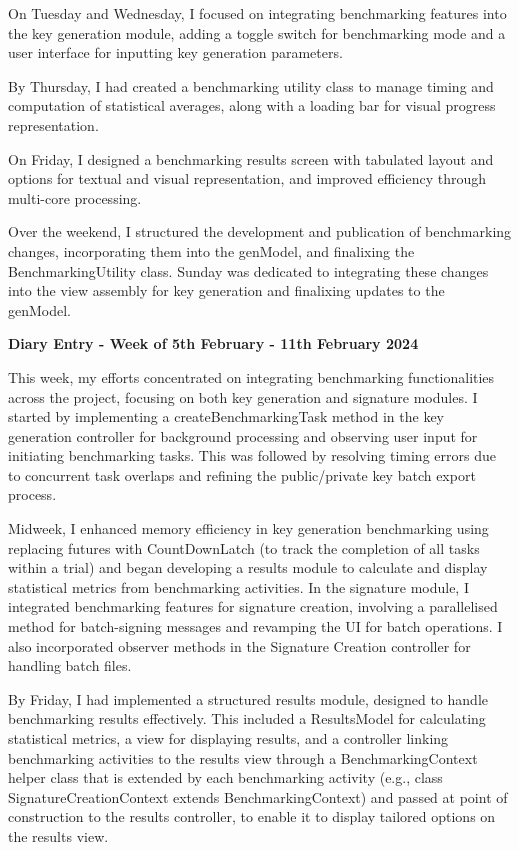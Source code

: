 \documentclass[]{final_report}
\theoremstyle{definition}
\begin{document}
On Tuesday and Wednesday, I focused on integrating benchmarking features into the key generation
module, adding a toggle switch for benchmarking mode and a user interface for inputting key
generation parameters.

By Thursday, I had created a benchmarking utility class to manage timing and computation of
statistical averages, along with a loading bar for visual progress representation.

On Friday, I designed a benchmarking results screen with tabulated layout and options for textual
and visual representation, and improved efficiency through multi-core processing.

Over the weekend, I structured the development and publication of benchmarking changes,
incorporating them into the genModel, and finalixing the BenchmarkingUtility class. Sunday was
dedicated to integrating these changes into the view assembly for key generation and finalixing
updates to the genModel.

\textbf{Diary Entry - Week of 5th February - 11th February 2024}

This week, my efforts concentrated on integrating benchmarking functionalities across the project,
focusing on both key generation and signature modules. I started by implementing a
createBenchmarkingTask method in the key generation controller for background processing and
observing user input for initiating benchmarking tasks. This was followed by resolving timing errors
due to concurrent task overlaps and refining the public/private key batch export process.

Midweek, I enhanced memory efficiency in key generation benchmarking using replacing futures with
CountDownLatch (to track the completion of all tasks within a trial) and began developing a results
module to calculate and display statistical metrics from benchmarking activities. In the signature
module, I integrated benchmarking features for signature creation, involving a parallelised method
for batch-signing messages and revamping the UI for batch operations. I also incorporated observer
methods in the Signature Creation controller for handling batch files.

By Friday, I had implemented a structured results module, designed to handle benchmarking results
effectively. This included a ResultsModel for calculating statistical metrics, a view for displaying
results, and a controller linking benchmarking activities to the results view through a
BenchmarkingContext helper class that is extended by each benchmarking activity (e.g., class
SignatureCreationContext extends BenchmarkingContext) and passed at point of construction to the
results controller, to enable it to display tailored options on the results view.
\end{document}

